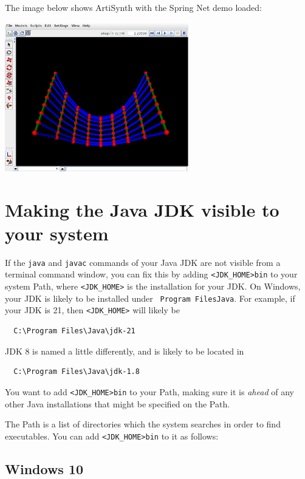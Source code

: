 The image below shows ArtiSynth with the {\sf Spring Net} demo loaded:

\begin{center}
   \includegraphics[width=0.60\textwidth]{images/SpringNetDemo}
\end{center}

\section{Making the Java JDK visible to your system}
\label{MakingJDKVisible:sec}

If the {\tt java} and {\tt javac} commands of your Java JDK are not
visible from a terminal command window, 
\ifWindows
you can fix this by adding
{\tt <JDK\_HOME>\BKS bin} to your system Path, where
{\tt <JDK\_HOME>} is the installation \directory{} for your JDK. 
On Windows, your JDK is likely to be installed under {\tt
Program Files\SEP Java}. For example, if your JDK is 21, 
then {\tt <JDK\_HOME>} will likely be
\begin{verbatim}
  C:\Program Files\Java\jdk-21
\end{verbatim}
JDK 8 is named a little differently, and is likely to be located in
\begin{verbatim}
  C:\Program Files\Java\jdk-1.8
\end{verbatim}

You want to add {\tt <JDK\_HOME>\SEP bin} to your Path, making
sure it is {\it ahead} of any other Java installations that might be specified
on the Path. 

The Path is a list of directories which the system searches in
order to find executables. You can add {\tt <JDK\_HOME>\BKS bin} 
to it as follows:

\subsection*{Windows 10}


